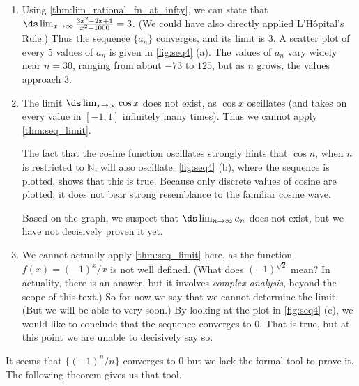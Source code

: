 {\begin{enumerate}
\item		Using \autoref{thm:lim_rational_fn_at_infty}, we can state that $\ds\lim_{x\to\infty} \frac{3x^2-2x+1}{x^2-1000} = 3$. (We could have also directly applied L'H\^opital's Rule.) Thus the sequence $\{a_n\}$ converges, and its limit is 3. A scatter plot of every 5 values of $a_n$ is given in \autoref{fig:seq4} (a). The values of $a_n$ vary widely near $n=30$, ranging from about $-73$ to $125$, but as $n$ grows, the values approach 3.

\item		The limit $\ds\lim_{x\to\infty}\cos x$ does not exist, as $\cos x$ oscillates (and takes on every value in $[-1,1]$ infinitely many times). Thus we cannot apply \autoref{thm:seq_limit}. 

The fact that the cosine function oscillates strongly hints that $\cos n$, when $n$ is restricted to $\mathbb{N}$, will also oscillate. \autoref{fig:seq4} (b), where the sequence is plotted, shows that this is true. Because only discrete values of cosine are plotted, it does not bear strong resemblance to the familiar cosine wave.

Based on the graph, we suspect that $\ds \lim_{n\to\infty} a_n$ does not exist, but we have not decisively proven it yet.


\item		We cannot actually apply \autoref{thm:seq_limit} here, as the function $f(x) = (-1)^x/x$ is not well defined. (What does $(-1)^{\sqrt{2}}$ mean? In actuality, there is an answer, but it involves \emph{complex analysis}, beyond the scope of this text.) So for now we say that we cannot determine the limit. (But we will be able to very soon.) By looking at the plot in \autoref{fig:seq4} (c), we would like to conclude that the sequence converges to 0. That is true, but at this point we are unable to decisively say so.\eoehere
\end{enumerate}}

It seems that  %
$\{(-1)^n/n\}$ converges to 0 but we lack the formal tool to prove it. The following theorem gives us that tool.

